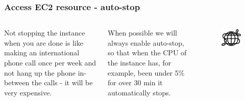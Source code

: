 \documentclass[aspectratio=169]{beamer} %
\begin{document}
\begin{frame}
	\frametitle{Access EC2 resource - auto-stop}
	
	\begin{columns}[c]
		
		
		Not stopping the instance when you are done is like making an international phone call once per week and not hang up the phone in-between the calls - it will be very expensive.
		
		\vspace{.5cm}
		
		When possible we will always enable auto-stop, so that when the CPU of the instance has, for example, been under 5\% for over 30 min it automatically stops.
		
		
		\begin{figure}
			\centering
			\includegraphics[width=\textwidth]{./img/international-call.png}
		\end{figure}
		
	\end{columns}
\end{frame}
\end{document}
